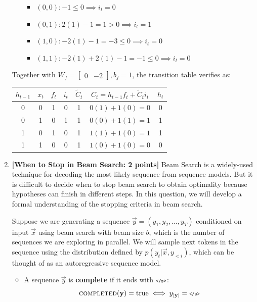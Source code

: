 \documentclass[11pt,english]{article}
\newcommand{\stopsym}{\mbox{\scriptsize \texttt{</s>}}\xspace}
\begin{document}
\begin{enumerate}[resume]
\begin{enumerate}
    \begin{itemize}
        \item $(0, 0): -1 \le 0 \implies i_t = 0$
        \item $(0, 1): 2(1) - 1 = 1 > 0 \implies i_t = 1$
        \item $(1, 0): -2(1) - 1 = -3 \le 0 \implies i_t = 0$
        \item $(1, 1): -2(1) + 2(1) - 1 = -1 \le 0 \implies i_t = 0$
    \end{itemize}
\end{enumerate}
Together with $W_f = \begin{bmatrix} 0 & -2 \end{bmatrix}, b_f = 1$, the transition table verifies as:
\begin{center}
\begin{tabular}{|c|c|c|c|c|c|c|}
\hline
$h_{t-1}$ & $x_t$ & $f_t$ & $i_t$ & $\tilde{C}_t$ & $C_t = h_{t-1} f_t + \tilde{C}_t i_t$ & $h_t$ \\
\hline
0 & 0 & 1 & 0 & 1 & $0(1) + 1(0) = 0$ & 0 \\
0 & 1 & 0 & 1 & 1 & $0(0) + 1(1) = 1$ & 1 \\
1 & 0 & 1 & 0 & 1 & $1(1) + 1(0) = 1$ & 1 \\
1 & 1 & 0 & 0 & 1 & $1(0) + 1(0) = 0$ & 0 \\
\hline
\end{tabular}
\end{center}

\newpage
\item
\textbf{[When to Stop in Beam Search: 2 points]}
Beam Search is a widely-used technique for decoding the most likely sequence from sequence models. 
But it is difficult to decide when to stop beam search to obtain optimality because hypotheses can finish in different steps. 
In this question, we will develop a formal understanding of the stopping criteria in beam search. 

Suppose we are generating a sequence $\vec{y} = (y_1, y_2, \ldots, y_T)$ conditioned on input $\vec{x}$ using beam search with beam size $b$, which is the number of sequences we are exploring in parallel. We will sample next tokens in the sequence using the distribution defined by $p(y_t|\vec{x}, y_{<i})$, which can be thought of as an autoregressive sequence model.

\begin{itemize}
    \item A sequence $\vec{y}$ is \textbf{complete} if it ends with $\stopsym$: 
    $$\textsc{completed}(\vec{y}) = \text{true} \iff y_{|\vec{y}|} = \stopsym$$
    

\end{itemize}
\end{enumerate}
\end{document}
